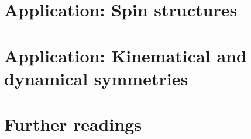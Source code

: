 \documentclass[a4paper,11pt]{article}
\theoremstyle{definition} %
\theoremstyle{plain} %
\theoremstyle{remark} %
\begin{document}
 \section{Application: Spin structures}
 
 \newpage

 \section{Application: Kinematical and dynamical symmetries}
 
 \newpage

 \section*{Further readings}
 

 \printindex
\end{document}
